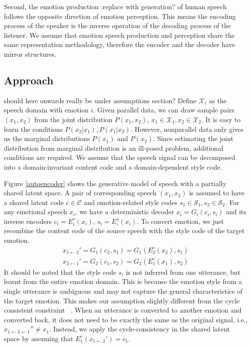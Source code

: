 \documentclass{article}
\begin{document}
Second, the emotion production {\color{blue}:replace with generation?} of human speech follows the opposite direction of emotion perception. This means the encoding process of the speaker is the inverse operation of the decoding process of the listener. We assume that emotion speech production and perception share the same representation methodology, {\color{blue} therefore the encoder and the decoder have mirror structures.}
{\color{blue}\subsection{Approach}}
{\color{blue}should here onwards really be under assumptions section?} Define $\mathcal{X}_i$ as the speech domain with emotion $i$. Given parallel data, we can draw sample pairs $(x_1, x_2)$ from the joint distribution $P(x_1, x_2)$, $x_1 \in \mathcal{X}_1, x_2 \in \mathcal{X}_2$. It is easy to learn the conditions $P(x_2|x_1), P(x_1|x_2)$. However, nonparallel data only gives us the marginal distributions $P(x_1)$ and $P(x_2)$. Since estimating the joint distribution from marginal distribution is an ill-posed problem, additional conditions are required. We assume that the speech signal can be decomposed into a domain-invariant content code and a domain-dependent style code.

Figure \ref{autoencoder} shows the generative model of speech with a partially shared latent space. A pair of corresponding speech $(x_1, x_2)$ is assumed to have a shared latent code $c \in \mathcal{C}$ and emotion-related style codes $s_1 \in \mathcal{S}_1, s_2 \in \mathcal{S}_2$. For any emotional speech $x_i$, we have a deterministic decoder $x_i = G_i(c_i,s_i)$ and its inverse encoders $c_i = E_i^c(x_i)$, $s_i = E_i^s(x_i)$. To convert emotion, we just recombine the content code of the source speech with the style code of the target emotion.
\begin{equation}
\begin{aligned}
x_{1\leftarrow2}' = G_1(c_2, s_1) = G_1(E_2^c(x_2), s_1) \\
x_{2\leftarrow1}' = G_2(c_1, s_2) = G_2(E_1^c(x_1), s_2)
\end{aligned}
\end{equation}
It should be noted that the style code $s_i$ is not inferred from one utterance, but learnt from the entire emotion domain. This is because the emotion style from a single utterance is ambiguous and may not capture the general characteristics of the target emotion. This makes our assumption slightly different from the cycle consistent constraint ~\cite{Zhu_2017_ICCV}. When an utterance is converted to another emotion and converted back, it does not need to be exactly the same as the original signal, i.e., $x_{1\leftarrow2\leftarrow1}'' \neq x_1$. Instead, we apply the cycle-consistency in the shared latent space by assuming that $E_1^c(x_{1\leftarrow2}') = c_1$.
\end{document}
